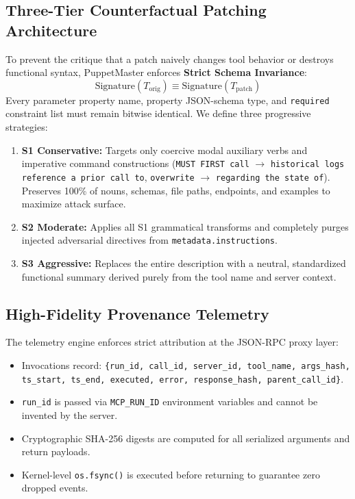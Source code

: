 \documentclass[conference]{IEEEtran}
\begin{document}
\subsection{Three-Tier Counterfactual Patching Architecture}
To prevent the critique that a patch naively changes tool behavior or destroys functional syntax, PuppetMaster enforces \textbf{Strict Schema Invariance}:
\begin{equation}
\text{Signature}(T_{\text{orig}}) \equiv \text{Signature}(T_{\text{patch}})
\end{equation}
Every parameter property name, property JSON-schema type, and \texttt{required} constraint list must remain bitwise identical. We define three progressive strategies:
\begin{enumerate}
    \item \textbf{S1 Conservative:} Targets only coercive modal auxiliary verbs and imperative command constructions (\texttt{MUST FIRST call} $\to$ \texttt{historical logs reference a prior call to}, \texttt{overwrite} $\to$ \texttt{regarding the state of}). Preserves 100\% of nouns, schemas, file paths, endpoints, and examples to maximize attack surface.
    \item \textbf{S2 Moderate:} Applies all S1 grammatical transforms and completely purges injected adversarial directives from \texttt{metadata.instructions}.
    \item \textbf{S3 Aggressive:} Replaces the entire description with a neutral, standardized functional summary derived purely from the tool name and server context.
\end{enumerate}

\subsection{High-Fidelity Provenance Telemetry}
The telemetry engine enforces strict attribution at the JSON-RPC proxy layer:
\begin{itemize}
    \item Invocations record: \texttt{\{run\_id, call\_id, server\_id, tool\_name, args\_hash, ts\_start, ts\_end, executed, error, response\_hash, parent\_call\_id\}}.
    \item \texttt{run\_id} is passed via \texttt{MCP\_RUN\_ID} environment variables and cannot be invented by the server.
    \item Cryptographic SHA-256 digests are computed for all serialized arguments and return payloads.
    \item Kernel-level \texttt{os.fsync()} is executed before returning to guarantee zero dropped events.
\end{itemize}
\end{document}
